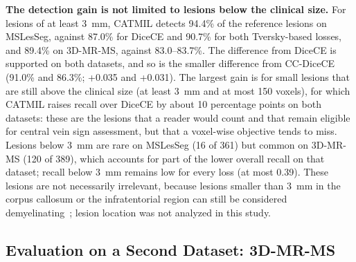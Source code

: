 \textbf{The detection gain is not limited to lesions below the clinical
size.} For lesions of at least 3~mm, CATMIL detects 94.4\% of the
reference lesions on MSLesSeg, against 87.0\% for DiceCE and 90.7\% for
both Tversky-based losses, and 89.4\% on 3D-MR-MS, against 83.0--83.7\%.
The difference from DiceCE is supported on both datasets, and so is the
smaller difference from CC-DiceCE (91.0\% and 86.3\%; +0.035 and +0.031).
The largest gain
is for small lesions that are still above the clinical size (at least
3~mm and at most 150 voxels), for which CATMIL raises recall over DiceCE by
about 10 percentage points on both datasets: these are the lesions that a reader
would count and that remain eligible for central vein sign assessment, but
that a voxel-wise objective tends to miss. Lesions below 3~mm are rare on
MSLesSeg (16 of 361) but common on 3D-MR-MS (120 of 389), which accounts
for part of the lower overall recall on that dataset; recall below 3~mm
remains low for every loss (at most 0.39). These lesions are not
necessarily irrelevant, because lesions smaller than 3~mm in the corpus
callosum or the infratentorial region can still be considered
demyelinating~\cite{barkhof_2024_2025}; lesion location was not analyzed
in this study.

\subsection{Evaluation on a Second Dataset: 3D-MR-MS}

